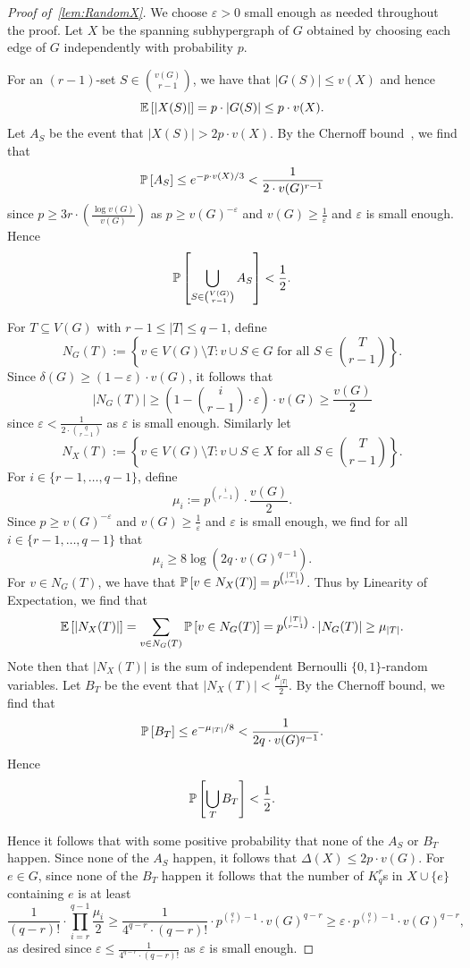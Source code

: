 \documentclass[11pt]{article}
\newcounter{i}
\theoremstyle{plain}
\renewcommand{\theclaim}{\thetheorem.\arabic{claim}}
\newenvironment{lateproof}[1]
 {%
  \renewcommand{\theclaim}{\ref{#1}.\arabic{claim}}%
  \begin{proof}[Proof of~\cref{#1}]%
 }
 {\end{proof}}
\theoremstyle{plain} %
\theoremstyle{definition}
\newcommand{\Prob}[1]{\ensuremath{%
\mathbb P\left[#1\right]
}}
\newcommand{\Expect}[1]{\ensuremath{%
\mathbb E\left[#1\right]
}}
\begin{document}
\begin{lateproof}{lem:RandomX}
We choose $\varepsilon > 0$ small enough as needed throughout the proof. Let $X$ be the spanning subhypergraph of $G$ obtained by choosing each edge of $G$ independently with probability $p$.

For an $(r-1)$-set $S\in \binom{v(G)}{r-1}$, we have that $|G(S)|\le v(X)$ and hence
$$\Expect{|X(S)|}=p\cdot |G(S)|\le p\cdot v(X).$$
Let $A_S$ be the event that $|X(S)| > 2p\cdot v(X)$.
By the Chernoff bound~\cite{AS16}, we find that 
$$\Prob{A_S} \le e^{-p\cdot v(X) / 3} < \frac{1}{2\cdot v(G)^{r-1}}$$
since $p\ge 3r\cdot \left(\frac{\log v(G)}{v(G)}\right)$ as $p\ge v(G)^{-\varepsilon}$ and $v(G)\ge \frac{1}{\varepsilon}$ and $\varepsilon$ is small enough. Hence $$\Prob{ \bigcup_{S\in\binom{V(G)}{r-1}} A_S} < \frac{1}{2}.$$

For $T\subseteq V(G)$ with $r-1\le |T|\le q-1$, define 
$$N_G(T):= \left\{ v\in V(G)\setminus T: v\cup S\in G \text{ for all } S\in \binom{T}{r-1}\right\}.$$ 
Since $\delta(G)\ge (1-\varepsilon)\cdot v(G)$, it follows that 
$$|N_G(T)| \ge \left(1-\binom{i}{r-1}\cdot \varepsilon\right)\cdot v(G) \ge \frac{v(G)}{2}$$
since $\varepsilon < \frac{1}{2\cdot \binom{q}{r-1}}$ as $\varepsilon$ is small enough. 
Similarly let
$$N_X(T):= \left\{ v\in V(G)\setminus T: v\cup S\in X \text{ for all } S\in \binom{T}{r-1}\right\}.$$
For $i\in \{r-1,\ldots, q-1\}$, define
$$\mu_i:= p^{\binom{i}{r-1}}\cdot \frac{v(G)}{2}.$$
Since $p\ge v(G)^{-\varepsilon}$ and $v(G)\ge \frac{1}{\varepsilon}$ and $\varepsilon$ is small enough, we find for all $i\in \{r-1,\ldots,q-1\}$ that 
$$\mu_i \ge 8 \log(2q\cdot v(G)^{q-1}).$$
For $v\in N_G(T)$, we have that $\Prob{v\in N_X(T)} = p^{\binom{|T|}{r-1}}$. Thus by Linearity of Expectation, we find that
$$\Expect{|N_X(T)|} = \sum_{v\in N_G(T)} \Prob{v\in N_G(T)} = p^{\binom{|T|}{r-1}}\cdot |N_G(T)|\ge \mu_{|T|}.$$
Note then that $|N_X(T)|$ is the sum of independent Bernoulli $\{0,1\}$-random variables. Let $B_T$ be the event that $|N_X(T)| < \frac{\mu_{|T|}}{2}$.  By the Chernoff bound, we find that
$$\Prob{B_T} \le e^{-\mu_{|T|}/ 8} < \frac{1}{2q\cdot v(G)^{q-1}}.$$
Hence 
$$\Prob{ \bigcup_{T} B_T} < \frac{1}{2}.$$


Hence it follows that with some positive probability that none of the $A_S$ or $B_T$ happen. Since none of the $A_S$ happen, it follows that $\Delta(X)\le 2p\cdot v(G)$. For $e\in G$, since none of the $B_T$ happen it follows that the number of $K_q^r$s in $X\cup \{e\}$ containing $e$ is at least
$$\frac{1}{(q-r)!}\cdot \prod_{i=r}^{q-1} \frac{\mu_i}{2} \ge \frac{1}{4^{q-r}\cdot (q-r)!} \cdot p^{\binom{q}{r}-1}\cdot v(G)^{q-r} \ge \varepsilon\cdot p^{\binom{q}{r}-1}\cdot v(G)^{q-r},$$
as desired since $\varepsilon \le \frac{1}{4^{q-r}\cdot (q-r)!}$ as $\varepsilon$ is small enough.
\end{lateproof}
\end{document}
